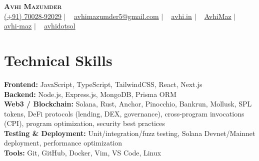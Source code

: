\documentclass[letterpaper,11pt]{article}
\begin{document}
\begin{center}
  \textbf{\Huge \scshape Avhi Mazumder} \\ \vspace{5pt}
  \small
  \hspace{0.1em}
  \href{(+91) 70028-92029}{\underline{(+91) 70028-92029}} $|$ \ 
  \hspace{0.1em}
  \href{mailto:avhimazumder5@gmail.com}{\underline{avhimazumder5@gmail.com}} $|$ \ 
  \hspace{0.1em}
  \href{https://avhi.in/}{\underline{avhi.in}} $|$ \ 
  \hspace{0.1em}
  \href{https://github.com/AvhiMaz}{\underline{AvhiMaz}} $|$ \ 
  \hspace{0.1em}
  \href{https://www.linkedin.com/in/avhi-maz/}{\underline{avhi-maz}} $|$ \ 
  \hspace{0.1em}
  \href{https://www.x.com/avhidotsol/}{\underline{avhidotsol}}
\end{center}

\section{Technical Skills}
\begin{itemize}[leftmargin=0.15in, label={}]
  \small{\item{
    \textbf{Frontend:} JavaScript, TypeScript, TailwindCSS, React, Next.js \\
    \textbf{Backend:} Node.js, Express.js, MongoDB, Prisma ORM \\
    \textbf{Web3 / Blockchain:} Solana, Rust, Anchor, Pinocchio, Bankrun, Mollusk, SPL tokens, DeFi protocols (lending, DEX, governance), cross-program invocations (CPI), program optimization, security best practices \\
    \textbf{Testing \& Deployment:} Unit/integration/fuzz testing, Solana Devnet/Mainnet deployment, performance optimization \\
    \textbf{Tools:} Git, GitHub, Docker, Vim, VS Code, Linux
  }}
\end{itemize}
\end{document}

